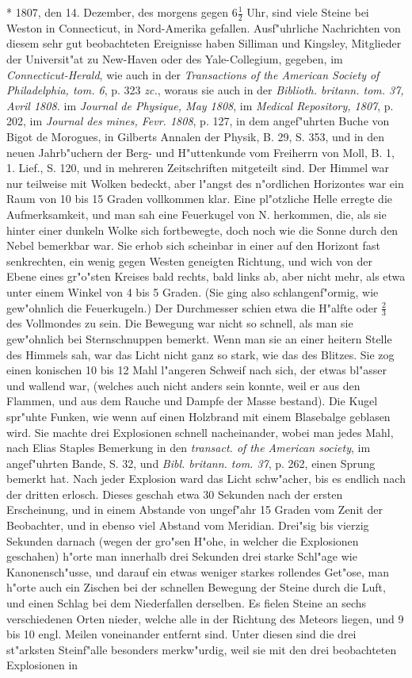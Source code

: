 \documentclass[a4paper, 11pt, oneside, polutonikogreek, german]{article}
\begin{document}
* 1807, den 14. Dezember, des morgens gegen $\mathfrak{6\frac{1}{2}}$ Uhr, sind viele Steine bei Weston in Connecticut, in Nord-Amerika gefallen. Ausf"uhrliche Nachrichten von diesem sehr gut beobachteten Ereignisse haben Silliman und Kingsley, Mitglieder der Universit"at zu New-Haven oder des Yale-Collegium, gegeben, im \emph{Connecticut-Herald}, wie auch in der \emph{Transactions of the American Society of Philadelphia, tom. 6}, p. 323 \emph{zc.}, woraus sie auch in der \emph{Biblioth. britann. tom. 37, Avril 1808.} im \emph{Journal de Physique, May 1808}, im \emph{Medical Repository, 1807}, p. 202, im \emph{Journal des mines, Fevr. 1808}, p. 127, in dem angef"uhrten Buche von Bigot de Morogues, in Gilberts Annalen der Physik, B. 29, S. 353, und in den neuen Jahrb"uchern der Berg- und H"uttenkunde vom Freiherrn von Moll, B. 1, 1. Lief., S. 120, und in mehreren Zeitschriften mitgeteilt sind. Der Himmel war nur teilweise mit Wolken bedeckt, aber l"angst des n"ordlichen Horizontes war ein Raum von 10 bis 15 Graden vollkommen klar. Eine pl"otzliche Helle erregte die Aufmerksamkeit, und man sah eine Feuerkugel von N. herkommen, die, als sie hinter einer dunkeln Wolke sich fortbewegte, doch noch wie die Sonne durch den Nebel bemerkbar war. Sie erhob sich scheinbar in einer auf den Horizont fast senkrechten, ein wenig gegen Westen geneigten Richtung, und wich von der Ebene eines gr"o"sten Kreises bald rechts, bald links ab, aber nicht mehr, als etwa unter einem Winkel von 4 bis 5 Graden. (Sie ging also schlangenf"ormig, wie gew"ohnlich die Feuerkugeln.) Der Durchmesser schien etwa die H"alfte oder $\mathfrak{\frac{2}{3}}$ des Vollmondes zu sein. Die Bewegung war nicht so schnell, als man sie gew"ohnlich bei Sternschnuppen bemerkt. Wenn man sie an einer heitern Stelle des Himmels sah, war das Licht nicht ganz so stark, wie das des Blitzes. Sie zog einen konischen 10 bis 12 Mahl l"angeren Schweif nach sich, der etwas bl"asser und wallend war, (welches auch nicht anders sein konnte, weil er aus den Flammen, und aus dem Rauche und Dampfe der Masse bestand). Die Kugel spr"uhte Funken, wie wenn auf einen Holzbrand mit einem Blasebalge geblasen wird. Sie machte drei Explosionen schnell nacheinander, wobei man jedes Mahl, nach Elias Staples Bemerkung in den \emph{transact. of the American society}, im angef"uhrten Bande, S. 32, und \emph{Bibl. britann. tom. 37}, p. 262, einen Sprung bemerkt hat. Nach jeder Explosion ward das Licht schw"acher, bis es endlich nach der dritten erlosch. Dieses geschah etwa 30 Sekunden nach der ersten Erscheinung, und in einem Abstande von ungef"ahr 15 Graden vom Zenit der Beobachter, und in ebenso viel Abstand vom Meridian. Drei"sig bis vierzig Sekunden darnach (wegen der gro"sen H"ohe, in welcher die Explosionen geschahen) h"orte man innerhalb drei Sekunden drei starke Schl"age wie Kanonensch"usse, und darauf ein etwas weniger starkes rollendes Get"ose, man h"orte auch ein Zischen bei der schnellen Bewegung der Steine durch die Luft, und einen Schlag bei dem Niederfallen derselben. Es fielen Steine an sechs verschiedenen Orten nieder, welche alle in der Richtung des Meteors liegen, und 9 bis 10 engl. Meilen voneinander entfernt sind. Unter diesen sind die drei st"arksten Steinf"alle besonders merkw"urdig, weil sie mit den drei beobachteten Explosionen in 
\end{document}
